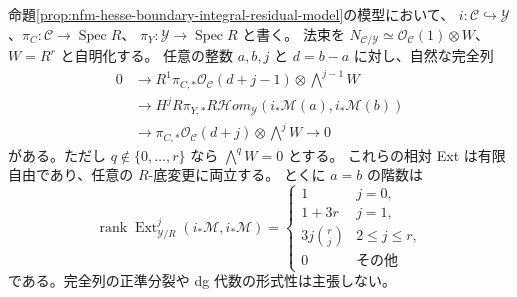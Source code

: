 \begin{lemma}
\label{lem:nfm-hesse-boundary-pushforward-ext-flat}
命題\ref{prop:nfm-hesse-boundary-integral-residual-model}の模型において、
$i:\mathcal C\hookrightarrow\mathcal Y$、$\pi_C:\mathcal C\to\operatorname{Spec}R$、
$\pi_Y:\mathcal Y\to\operatorname{Spec}R$ と書く。
法束を $N_{\mathcal C/\mathcal Y}\simeq\mathcal O_{\mathcal C}(1)\otimes W$、
$W=R^r$ と自明化する。
任意の整数 $a,b,j$ と $d=b-a$ に対し、自然な完全列
\begin{align*}
 0&\longrightarrow
 R^1\pi_{C,*}\mathcal O_{\mathcal C}(d+j-1)
       \otimes\bigwedge^{j-1}W\\
 &\longrightarrow
 H^jR\pi_{Y,*}R\mathcal Hom_{\mathcal Y}
       (i_*\mathcal M(a),i_*\mathcal M(b))\\
 &\longrightarrow
 \pi_{C,*}\mathcal O_{\mathcal C}(d+j)
       \otimes\bigwedge^jW\longrightarrow0
\end{align*}
がある。ただし $q\notin\{0,\ldots,r\}$ なら $\bigwedge^qW=0$ とする。
これらの相対 Ext は有限自由であり、任意の $R$-底変更に両立する。
とくに $a=b$ の階数は
\[
 \operatorname{rank}\operatorname{Ext}^j_{\mathcal Y/R}(i_*\mathcal M,i_*\mathcal M)
 =\begin{cases}
 1&j=0,\\
 1+3r&j=1,\\
 3j\binom rj&2\le j\le r,\\
 0&\text{その他}
 \end{cases}
\]
である。完全列の正準分裂や dg 代数の形式性は主張しない。
\end{lemma}

